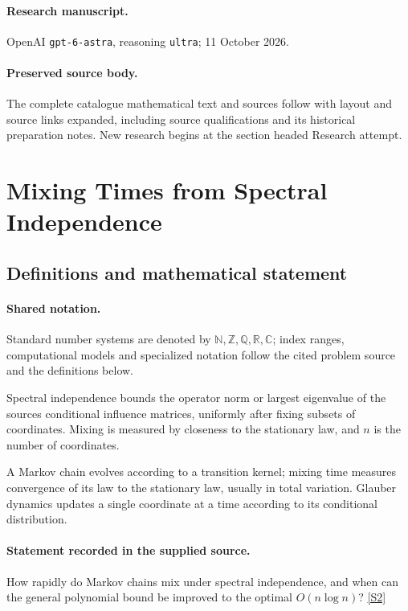 \documentclass[11pt]{article}
\begin{document}
\paragraph{Research manuscript.} OpenAI \texttt{gpt-6-astra}, reasoning \texttt{ultra}; 11 October 2026.
\paragraph{Preserved source body.} The complete catalogue mathematical text and sources follow with layout and source links expanded, including source qualifications and its historical preparation notes. New research begins at the section headed Research attempt.

\section{Mixing Times from Spectral Independence}\label{statement}

\subsection{Definitions and mathematical statement}

\paragraph{Shared notation.}Standard number systems are denoted by $\mathbb N,\mathbb Z,\mathbb Q,\mathbb R,\mathbb C$; index ranges, computational models and specialized notation follow the cited problem source and the definitions below.


Spectral independence bounds the operator norm or largest eigenvalue of the source\textquotesingle s conditional influence matrices, uniformly after fixing subsets of coordinates. Mixing is measured by closeness to the stationary law, and $n$ is the number of coordinates.

A Markov chain evolves according to a transition kernel; mixing time measures convergence of its law to the stationary law, usually in total variation. Glauber dynamics updates a single coordinate at a time according to its conditional distribution.
\paragraph{Statement recorded in the supplied source.}
How rapidly do Markov chains mix under spectral independence, and when can the general polynomial bound be improved to the optimal $O(n\log n)$? \href{https://doi.org/10.4171/owr/2024/27}{[S2]}
\end{document}
